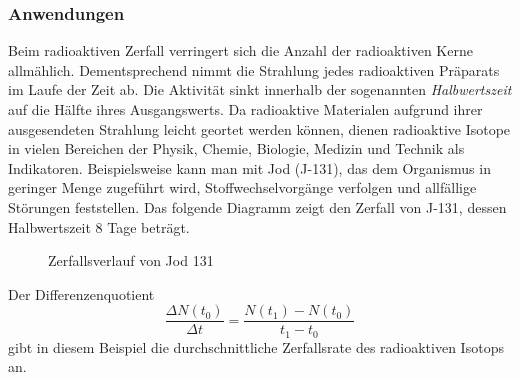 \documentclass[%
11pt,%
twoside,%
titlepage,%
german,%
headsepline%
]{scrartcl}
\begin{document}
\subsubsection{Anwendungen}
\begin{bsp}\label{bspradioaktiv}
Beim radioaktiven Zerfall verringert sich die Anzahl der radioaktiven Kerne allm\"ahlich. Dementsprechend nimmt die Strahlung jedes radioaktiven Pr\"aparats im Laufe der Zeit ab. Die Aktivit\"at sinkt innerhalb der sogenannten \emph{Halbwertszeit} auf die H\"alfte ihres Ausgangswerts. Da radioaktive Materialen aufgrund ihrer ausgesendeten Strahlung leicht geortet werden k\"onnen, dienen radioaktive Isotope in vielen Bereichen der Physik, Chemie, Biologie, Medizin und Technik als Indikatoren. Beispielsweise kann man mit Jod (J-131), das dem Organismus in geringer Menge zugef\"uhrt wird, Stoffwechselvorg\"ange verfolgen und allf\"allige St\"orungen feststellen. Das folgende Diagramm zeigt den Zerfall von J-131, dessen Halbwertszeit 8 Tage betr\"agt.

\begin{figure}
\begin{center}
\caption{Zerfallsverlauf von Jod 131}\label{jod}
\end{center}
\end{figure}

Der Differenzenquotient
$$\frac{\Delta N(t_0)}{\Delta t}=\frac{N(t_1)-N(t_0)}{t_1-t_0}$$
gibt in diesem Beispiel die durchschnittliche Zerfallsrate des radioaktiven Isotops an.
\end{bsp}
\end{document}
